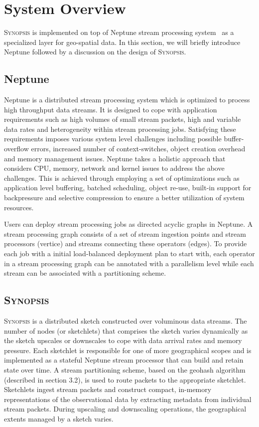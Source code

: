 \section{System Overview}
\label{sec:system}
\textsc{Synopsis} is implemented on top of Neptune stream processing system~\cite{buddhika2016neptune} as a specialized layer for geo-spatial data.
In this section, we will briefly introduce Neptune followed by a discussion on the design of \textsc{Synopsis}.

\subsection{Neptune}
Neptune is a distributed stream processing system which is optimized to process high throughput data streams.
It is designed to cope with application requirements such as high volumes of small stream packets, high and variable data rates and heterogeneity within stream processing jobs.
Satisfying these requirements imposes various system level challenges including possible buffer-overflow errors, increased number of context-switches, object creation overhead and memory management issues.
Neptune takes a holistic approach that considers CPU, memory, network and kernel issues to address the above challenges.
This is achieved through employing a set of optimizations such as application level buffering, batched scheduling, object re-use, built-in support for backpressure and selective compression to ensure a better utilization of system resources.

Users can deploy stream processing jobs as directed acyclic graphs in Neptune.
A stream processing graph consists of a set of stream ingestion points and stream processors (vertice) and streams connecting these operators (edges).
To provide each job with a initial load-balanced deployment plan to start with, each operator in a stream processing graph can be annotated with a parallelism level while each stream can be associated with a partitioning scheme.

\subsection{\textsc{Synopsis}}
\textsc{Synopsis} is a distributed sketch constructed over voluminous data streams.
The number of nodes (or sketchlets) that comprises the sketch varies dynamically as the sketch upscales or downscales to cope with data arrival rates and memory pressure.
Each sketchlet is responsible for one of more geographical scopes and is implemented as a stateful Neptune stream processor that can build and retain state over time.
A stream partitioning scheme, based on the geohash algorithm (described in section 3.2), is used to route packets to the appropriate sketchlet.
Sketchlets ingest stream packets and construct compact, in-memory representations of the observational data by extracting metadata from individual stream packets.
During upscaling and downscaling operations, the geographical extents managed by a sketch varies.


